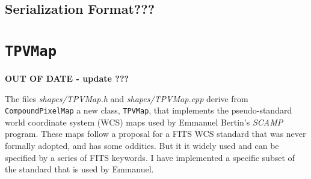 \documentclass[11pt,preprint,flushrt]{aastex}
\begin{document}
\subsection{Serialization Format???}

\section{{\tt TPVMap}}

{\bf OUT OF DATE - update ???}

The files {\it shapes/TPVMap.h} and {\it shapes/TPVMap.cpp} derive from {\tt CompoundPixelMap} a new class, {\tt TPVMap}, that implements the pseudo-standard world coordinate system (WCS) maps used by Emmanuel Bertin's {\it SCAMP} program.  These maps follow a proposal for a FITS WCS standard that was never formally adopted, and has some oddities.  But it it widely used and can be specified by a series of FITS keywords.  I have implemented a specific subset of the standard that is used by Emmanuel.
\end{document}
